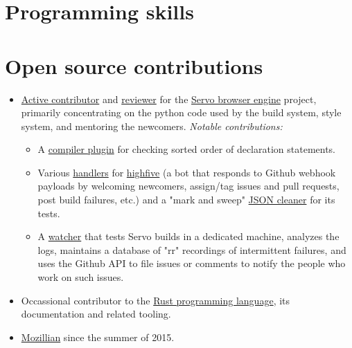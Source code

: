 \documentclass[11pt,a4paper,sans]{moderncv}        %
\newcommand\chref[3][linky]{\href{#2}{\color{#1}#3}}
\begin{document}
\section{Programming skills}

\section{Open source contributions}
\begin{itemize}
\item \chref{https://github.com/servo/servo/commits?author=Wafflespeanut}{Active contributor} and \chref{https://blog.servo.org/2016/01/11/twis-47/}{reviewer} for the \chref{https://github.com/servo/servo}{Servo browser engine} project, primarily concentrating on the python code used by the build system, style system, and mentoring the newcomers.
\newline
\textit{Notable contributions:}
\begin{itemize}
\item A \chref{https://github.com/Wafflespeanut/rust-sorty}{compiler plugin} for checking sorted order of declaration statements.
\item Various \chref{https://github.com/servo/highfive/commits?author=Wafflespeanut}{handlers} for \chref{https://github.com/servo/highfive}{highfive} (a bot that responds to Github webhook payloads by welcoming newcomers, assign/tag issues and pull requests, post build failures, etc.) and a "mark and sweep" \chref{https://github.com/servo/highfive/pull/115}{JSON cleaner} for its tests.
\item A \chref{https://github.com/servo-automation/servo-wpt}{watcher} that tests Servo builds in a dedicated machine, analyzes the logs, maintains a database of "rr" recordings of intermittent failures, and uses the Github API to file issues or comments to notify the people who work on such issues.
\end{itemize}
\item Occassional contributor to the \chref{https://github.com/rust-lang/rust}{Rust programming language}, its documentation and related tooling.
\item \chref{https://mozillians.org/en-US/u/wafflespeanut}{Mozillian} since the summer of 2015.
\end{itemize}

\newpage
\end{document}
